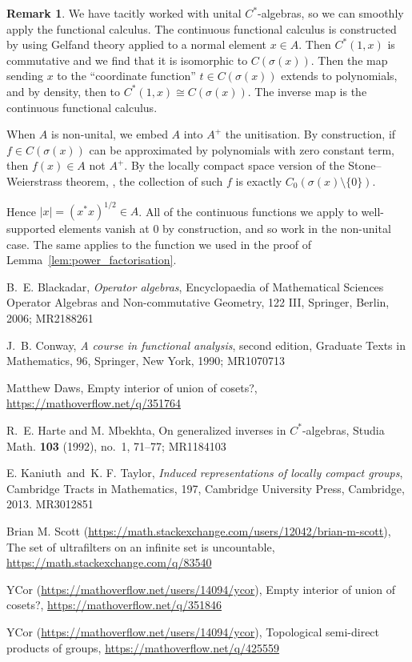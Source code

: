 \documentclass[twoside,a4paper,12pt]{article}
\theoremstyle{plain}
\theoremstyle{definition}
\newtheorem{remark}[proposition]{Remark}
\begin{document}
\begin{remark}
We have tacitly worked with unital $C^*$-algebras, so we can smoothly apply the functional calculus.  The continuous functional calculus is constructed by using Gelfand theory applied to a normal element $x\in A$.  Then $C^*(1,x)$ is commutative and we find that it is isomorphic to $C(\sigma(x))$.  Then the map sending $x$ to the ``coordinate function'' $t \in C(\sigma(x))$ extends to polynomials, and by density, then to $C^*(1,x) \cong C(\sigma(x))$.  The inverse map is the continuous functional calculus.

When $A$ is non-unital, we embed $A$ into $A^+$ the unitisation.  By construction, if $f \in C(\sigma(x))$ can be approximated by polynomials with zero constant term, then $f(x) \in A$ not $A^+$.  By the locally compact space version of the Stone--Weierstrass theorem, \cite[Corollary~V.8.3]{conway}, the collection of such $f$ is exactly $C_0(\sigma(x)\setminus\{0\})$.

Hence $|x| = (x^*x)^{1/2} \in A$.  All of the continuous functions we apply to well-supported elements vanish at $0$ by construction, and so work in the non-unital case.  The same applies to the function we used in the proof of Lemma~\ref{lem:power_factorisation}.
\end{remark}



\begin{thebibliography}{aa}

 B.~E. Blackadar, {\it Operator algebras}, Encyclopaedia of Mathematical Sciences Operator Algebras and Non-commutative Geometry, 122 III, Springer, Berlin, 2006; MR2188261

 J.~B. Conway, {\it A course in functional analysis}, second edition, 
Graduate Texts in Mathematics, 96, Springer, New York, 1990; MR1070713

 Matthew Daws, Empty interior of union of cosets?, 
   \url{https://mathoverflow.net/q/351764}

 R.~E. Harte and M. Mbekhta, On generalized inverses in $C^*$-algebras, Studia Math. {\bf 103} (1992), no.~1, 71--77; MR1184103

 E. Kaniuth\ and\ K. F. Taylor, {\it Induced representations of locally compact groups}, Cambridge Tracts in Mathematics, 197, Cambridge University Press, Cambridge, 2013. MR3012851

 Brian M. Scott (\url{https://math.stackexchange.com/users/12042/brian-m-scott}), The set of ultrafilters on an infinite set is uncountable, \url{https://math.stackexchange.com/q/83540}

 YCor (\url{https://mathoverflow.net/users/14094/ycor}), Empty interior of union of cosets?,
   \url{https://mathoverflow.net/q/351846}

 YCor (\url{https://mathoverflow.net/users/14094/ycor}), Topological semi-direct products of groups,
   \url{https://mathoverflow.net/q/425559}

\end{thebibliography}
\end{document}

